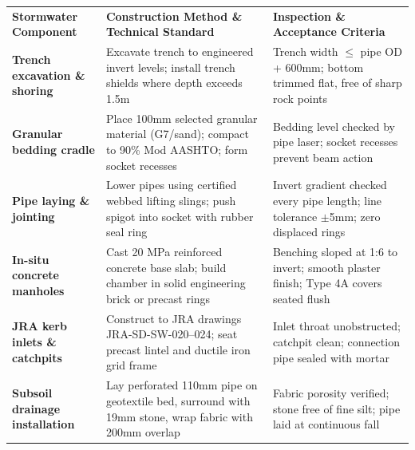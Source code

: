 \documentclass[a4paper,11pt]{article}
\begin{document}
{\fontsize{7.7pt}{9.8pt}\selectfont
\renewcommand{\arraystretch}{1.23}
\noindent
\begin{tabularx}{\textwidth}{@{}p{3.3cm} p{6.6cm} X@{}}
\rowcolor{mhnavy}
{\color{white}\bfseries Stormwater Component} & {\color{white}\bfseries Construction Method \& Technical Standard} & {\color{white}\bfseries Inspection \& Acceptance Criteria} \\
\rowcolor{mhbluelight}
\bfseries Trench excavation \& shoring & Excavate trench to engineered invert levels; install trench shields where depth exceeds 1.5m & Trench width $\le$ pipe OD + 600mm; bottom trimmed flat, free of sharp rock points \\
\bfseries Granular bedding cradle & Place 100mm selected granular material (G7/sand); compact to 90\% Mod AASHTO; form socket recesses & Bedding level checked by pipe laser; socket recesses prevent beam action \\
\rowcolor{mhbluelight}
\bfseries Pipe laying \& jointing & Lower pipes using certified webbed lifting slings; push spigot into socket with rubber seal ring & Invert gradient checked every pipe length; line tolerance $\pm$5mm; zero displaced rings \\
\bfseries In-situ concrete manholes & Cast 20 MPa reinforced concrete base slab; build chamber in solid engineering brick or precast rings & Benching sloped at 1:6 to invert; smooth plaster finish; Type 4A covers seated flush \\
\rowcolor{mhbluelight}
\bfseries JRA kerb inlets \& catchpits & Construct to JRA drawings JRA-SD-SW-020--024; seat precast lintel and ductile iron grid frame & Inlet throat unobstructed; catchpit clean; connection pipe sealed with mortar \\
\bfseries Subsoil drainage installation & Lay perforated 110mm pipe on geotextile bed, surround with 19mm stone, wrap fabric with 200mm overlap & Fabric porosity verified; stone free of fine silt; pipe laid at continuous fall \\
\end{tabularx}
\renewcommand{\arraystretch}{1}
}

\vfill
\end{document}

